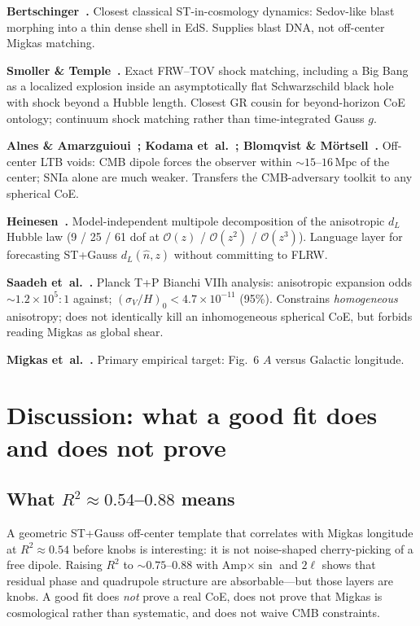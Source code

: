 \documentclass[11pt,a4paper]{article}
\begin{document}
\textbf{Bertschinger~\citep{Bertschinger1983}.}
Closest classical ST-in-cosmology dynamics: Sedov-like blast morphing into a
thin dense shell in EdS. Supplies blast DNA, not off-center Migkas matching.

\textbf{Smoller \& Temple~\citep{SmollerTemple1998,SmollerTemple2002}.}
Exact FRW--TOV shock matching, including a Big Bang as a localized explosion
inside an asymptotically flat Schwarzschild black hole with shock beyond a
Hubble length. Closest GR cousin for beyond-horizon CoE ontology; continuum
shock matching rather than time-integrated Gauss $g$.

\textbf{Alnes \& Amarzguioui~\citep{Alnes2006}; Kodama et~al.~\citep{Kodama2010};
Blomqvist \& M{\"o}rtsell~\citep{Blomqvist2010}.}
Off-center LTB voids: CMB dipole forces the observer within
$\sim15$--$16\,\mathrm{Mpc}$ of the center; SNIa alone are much weaker.
Transfers the CMB-adversary toolkit to any spherical CoE.

\textbf{Heinesen~\citep{Heinesen2020}.}
Model-independent multipole decomposition of the anisotropic $d_L$ Hubble law
(9 / 25 / 61 dof at $\mathcal{O}(z)$ / $\mathcal{O}(z^2)$ / $\mathcal{O}(z^3)$).
Language layer for forecasting ST+Gauss $d_L(\hat{n},z)$ without committing to
FLRW.

\textbf{Saadeh et~al.~\citep{Saadeh2016}.}
Planck T+P Bianchi VIIh analysis: anisotropic expansion odds
$\sim1.2\times10^5:1$ against; $(\sigma_V/H)_0<4.7\times10^{-11}$ (95\%).
Constrains \emph{homogeneous} anisotropy; does not identically kill an
inhomogeneous spherical CoE, but forbids reading Migkas as global shear.

\textbf{Migkas et~al.~\citep{Migkas2020}.}
Primary empirical target: Fig.~6 $A$ versus Galactic longitude.

\section{Discussion: what a good fit does and does not prove}
\label{sec:discussion}

\subsection{\texorpdfstring{What $R^2\approx0.54$--$0.88$ means}{What R2 approx 0.54--0.88 means}}
A geometric ST+Gauss off-center template that correlates with Migkas longitude
at $R^2\approx0.54$ before knobs is interesting: it is not noise-shaped
cherry-picking of a free dipole. Raising $R^2$ to $\sim0.75$--$0.88$ with
Amp$\times\sin$ and $2\ell$ shows that residual phase and quadrupole structure
are absorbable---but those layers are knobs. A good fit does \emph{not} prove a real CoE, does not prove that Migkas is
cosmological rather than systematic, and does not waive CMB constraints.
\end{document}
